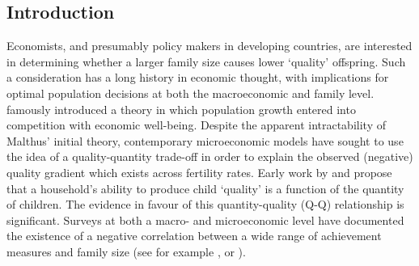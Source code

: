\documentclass{article}[11pt,subeqn]
\begin{document}
\begin{spacing}{1.5}

\begin{abstract}
Given the endogenous nature of a family's fertility decisions, demonstrating the existence of a trade-off between child quality and child quantity requires the identification of a 
valid exclusion restriction in a quality-quantity model.  Prior work has suggested that multiple births are an appropriate manner to estimate this relationship.  I show that twin 
births are \emph{not} exogenous in a developing country setting, invalidating the identifying assumption of this methodology in this situation.  Instead twin birth depends on a 
range of observable (and potentially unobservable) 
characteristics of the mother, such as height, BMI, and family income.  The effect of this result on typical 2SLS estimates is then examined via Monte Carlo simulation, and 
empirically using pooled results from the Demographic and Health Surveys, a dataset consisting of more that 1,000,00 children from 44 developing countries.  Given the poor 
performance of these estimates under simulation, an alternative methodology is employed to determine the plausibility of family size having any effect on child quality.  This
methodology suggests that higher sibship produces a larger delay in educational attainment and total years of schooling, but suggests that family size has less effect on child
attendance.  
\end{abstract}

\section{Introduction}
\label{scn:intro}
Economists, and presumably policy makers in developing countries, are interested in determining whether a larger family size causes lower `quality' offspring.  Such a consideration
 has a long history in economic thought, with implications for optimal population decisions at both the macroeconomic and family level.  
\citet{Malthus1798} famously introduced a theory in which population 
growth entered into competition with economic well-being.  Despite the apparent intractability of Malthus' initial theory, contemporary microeconomic models have sought to use 
the idea of a quality-quantity trade-off in order to explain the observed (negative) quality gradient which exists across fertility rates.  Early work by \citet{BeckerLewis1973} 
and \citet{BeckerTomes1976} propose that a household's ability to produce child `quality' is a function of the quantity of children.  The evidence in favour of this quantity-quality 
(Q-Q) relationship is significant.  Surveys at both a macro- and microeconomic level have documented the existence of a negative correlation between a wide range of achievement 
measures and family size (see for example \cite{Desai1995}, or \cite{Hanushek1992}).


\end{spacing}
\end{document}
